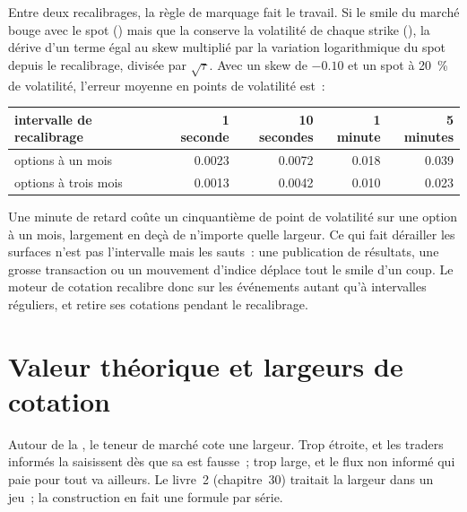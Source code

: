 Entre deux recalibrages, la règle de marquage fait le travail. Si le smile du marché bouge avec le spot () mais que la  conserve la volatilité de chaque strike
(), la  dérive d'un terme égal au skew multiplié par la variation logarithmique du spot depuis le recalibrage, divisée par $\sqrt\tau$. Avec un skew de $-0.10$ et un
spot à 20~\% de volatilité, l'erreur moyenne en points de volatilité est~:

\begin{center}\small
\begin{tabular}{lrrrr}
\toprule
intervalle de recalibrage & 1 seconde & 10 secondes & 1 minute & 5 minutes\\
\midrule
options à un mois & 0.0023 & 0.0072 & 0.018 & 0.039\\
options à trois mois & 0.0013 & 0.0042 & 0.010 & 0.023\\
\bottomrule
\end{tabular}
\end{center}

Une minute de retard coûte un cinquantième de point de volatilité sur une option à un mois, largement en deçà de n'importe quelle largeur. Ce qui fait dérailler les surfaces n'est pas
l'intervalle mais les sauts~: une publication de résultats, une grosse transaction ou un mouvement d'indice déplace tout le smile d'un coup. Le moteur de cotation recalibre donc sur
les événements autant qu'à intervalles réguliers, et retire ses cotations pendant le recalibrage.

\section{Valeur théorique et largeurs de cotation}

Autour de la , le teneur de marché cote une largeur. Trop étroite, et les traders informés la saisissent dès que sa  est fausse~; trop large, et le
flux non informé qui paie pour tout va ailleurs. Le livre~2 (chapitre~30) traitait la largeur dans un jeu~; la construction en fait une formule par
série.

